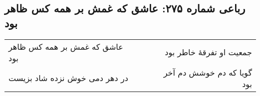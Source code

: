 \begin{center}
\section*{رباعی شماره ۲۷۵: عاشق که غمش بر همه کس ظاهر بود}
\label{sec:sh275}
\begin{longtable}{l p{0.5cm} r}
عاشق که غمش بر همه کس ظاهر بود
&&
جمعیت او تفرقهٔ خاطر بود
\\
در دهر دمی خوش نزده شاد بزیست
&&
گویا که دم خوشش دم آخر بود
\\
\end{longtable}
\end{center}
